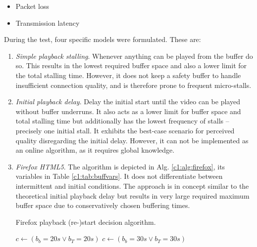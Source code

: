 \begin{itemize}
\item Packet loss
\item Transmission latency
\end{itemize}

During the test, four specific models were formulated. These are:

\begin{enumerate}
\item \textit{Simple playback stalling}. Whenever anything can be played from the buffer do so. This results in the lowest required buffer space and also a lower limit for the total stalling time. However, it does not keep a safety buffer to handle insufficient connection quality, and is therefore prone to frequent micro-stalls.


\item \textit{Initial playback delay}. Delay the initial start until the video can be played without buffer underruns. It also acts as a lower limit for buffer space and total stalling time but additionally has the lowest frequency of stalls -- precisely one initial stall. It exhibits the best-case scenario for perceived quality disregarding the initial delay. However, it can not be implemented as an online algorithm, as it requires global knowledge.


\item \textit{Firefox HTML5}. The algorithm is depicted in Alg. \ref{c1:alg:firefox}, its variables in Table \ref{c1:tab:buffvars}. It does not differentiate between intermittent and initial conditions. The approach is in concept similar to the theoretical initial playback delay but results in very large required maximum buffer space due to conservatively chosen buffering times.

\begin{algorithm}
    \centering
    \caption{Firefox playback (re-)start decision algorithm.}
    \label{c1:alg:firefox}
    \begin{algorithmic}
          \STATE $c \gets ( b_b=20s \lor b_T=20s )$
        \ELSE
          \STATE $c \gets ( b_b=30s \lor b_T=30s )$
        \ENDIF 
    \end{algorithmic}
\end{algorithm}


\end{enumerate}
